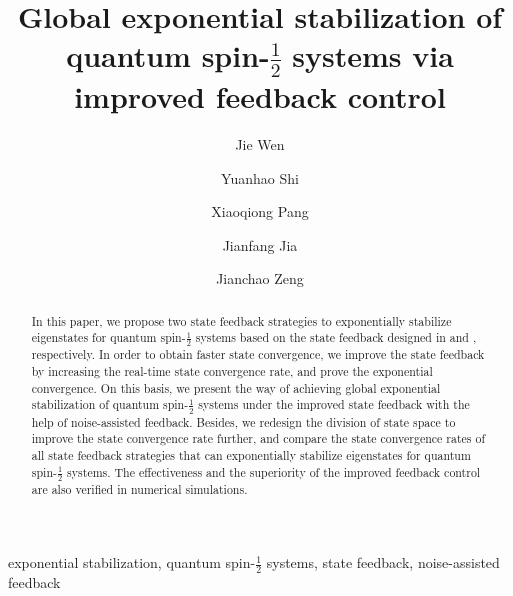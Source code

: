 \documentclass[]{elsarticle}
\begin{document}
\begin{frontmatter}

\title{Global exponential stabilization of quantum spin-$\frac{1}{2}$ systems via improved feedback control}

\author[NUC1,NUC1plus]{Jie Wen}

\author[NUC1,NUC1plus]{Yuanhao Shi}

\author[NUC2]{Xiaoqiong Pang}

\author[NUC3]{Jianfang Jia}

\author[NUC2]{Jianchao Zeng}

\address[NUC1]{Department of Automation, North University of China, Taiyuan 030051, China}
\address[NUC1plus]{Unmanned Systems Institute, North University of China, Taiyuan 030051, China}
\address[NUC2]{School of Data Science and Technology, North University of China, Taiyuan 030051, China}
\address[NUC3]{Department of Transportation Engineering, North University of China, Taiyuan 030051, China}


\begin{abstract}
In this paper, we propose two state feedback strategies to exponentially stabilize eigenstates for quantum spin-$\frac{1}{2}$ systems based on the state feedback designed in \cite{LAMC2018} and \cite{WSJZJ2021b}, respectively. In order to obtain faster state convergence, we improve the state feedback by increasing the real-time state convergence rate, and prove the exponential convergence. On this basis, we present the way of achieving global exponential stabilization of quantum spin-$\frac{1}{2}$ systems under the improved state feedback with the help of noise-assisted feedback. Besides, we redesign the division of state space to improve the state convergence rate further, and compare the state convergence rates of all state feedback strategies that can exponentially stabilize eigenstates for quantum spin-$\frac{1}{2}$ systems. The effectiveness and the superiority of the improved feedback control are also verified in numerical simulations.
\end{abstract}

\begin{keyword}
exponential stabilization, quantum spin-$\frac{1}{2}$ systems, state feedback, noise-assisted feedback
\end{keyword}

\end{frontmatter}
\end{document}
